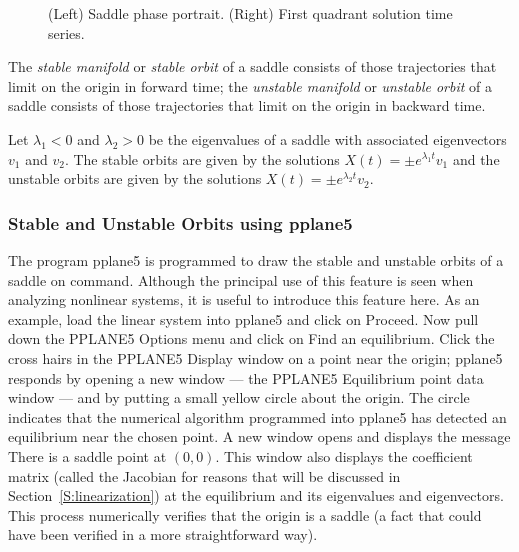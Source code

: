 \documentclass{ximera}
\begin{document}
\begin{figure}[htb]
           \centerline{%
           }
           \caption{(Left) Saddle phase portrait.
	(Right) First quadrant solution time series.}
           \label{F:linsaddle}
\end{figure}

\begin{definition} \label{D:stablemfld}
The {\em stable manifold\/} or {\em stable orbit\/} of a saddle consists of
those trajectories that limit on the origin in forward time; the
{\em unstable manifold\/} or {\em unstable orbit\/} of a saddle consists of
those trajectories that limit on the origin in backward time.
\end{definition}
 
 

Let $\lambda_1<0$ and $\lambda_2>0$ be the eigenvalues of a saddle with
associated eigenvectors $v_1$ and $v_2$.  The stable orbits are given by the
solutions $X(t) = \pm e^{\lambda_1 t}v_1$ and the unstable orbits are given
by the solutions $X(t) = \pm e^{\lambda_2 t}v_2$.

\subsubsection*{Stable and Unstable Orbits using {\sf pplane5}}

The program {\sf pplane5} is programmed to draw the stable and unstable
orbits of a saddle on command. Although the principal use of this
feature is seen when analyzing nonlinear systems, it is useful to
introduce this feature here.  As an example, load the linear system
 into {\sf pplane5} and click on {\sf Proceed}.  Now
pull down the {\sf PPLANE5 Options} menu and click on {\sf Find an
equilibrium}.  Click the cross hairs in the {\sf PPLANE5 Display}
window on a point near the origin; {\sf pplane5} responds by
opening a new window --- the {\sf PPLANE5 Equilibrium point data}
window --- and by putting a small yellow circle about the
origin.  The circle indicates that the numerical algorithm
programmed into {\sf pplane5} has detected an equilibrium near
the chosen point. A new window opens and displays the message
{\sf There is a saddle point at} $(0,0)$.  This window also displays the
coefficient matrix (called the Jacobian for reasons that will be discussed
in Section~\ref{S:linearization}) at the equilibrium and its eigenvalues
and eigenvectors.  This process numerically verifies that the origin
is a saddle (a fact that could have been verified in a more
straightforward way).
\end{document}
